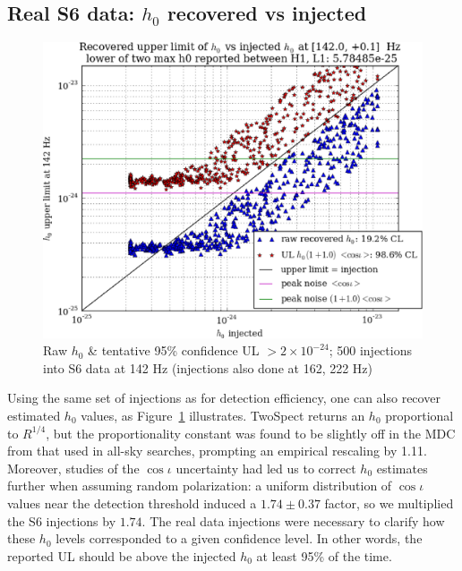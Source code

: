         \subsection{Real S6 data: $h_0$ recovered vs injected}

\begin{figure}
\begin{center}
\includegraphics[width=0.70\paperwidth,height=0.48\paperheight]{plots/h0UL-vs-h0injected-142-0Hz.eps}
\caption{
Raw $h_0$ \& tentative 95\% confidence UL $>2\times10^{-24}$; 500 injections
into S6 data at 142 Hz (injections also done at 162, 222 Hz)}
\label{S6_ULs_142}
\end{center}
\end{figure}

Using the same set of injections as for detection efficiency, one can also recover estimated $h_0$ values, as Figure~\ref{S6_ULs_142} illustrates.
TwoSpect returns an $h_0$ proportional to $R^{1/4}$, but the proportionality constant was found to be slightly off in the MDC from that used in all-sky searches, prompting an empirical rescaling by 1.11.
Moreover, studies of the $\cos \iota$ uncertainty had led us to correct $h_0$ estimates further when assuming random polarization: a uniform distribution of $\cos \iota$ values near the detection threshold induced a $1.74 \pm 0.37$ factor, so we multiplied the S6 injections by $1.74$.
The real data injections were necessary to clarify how these $h_0$ levels corresponded to a given confidence level. 
In other words, the reported UL should be above the injected $h_0$ at least 95\% of the time.

